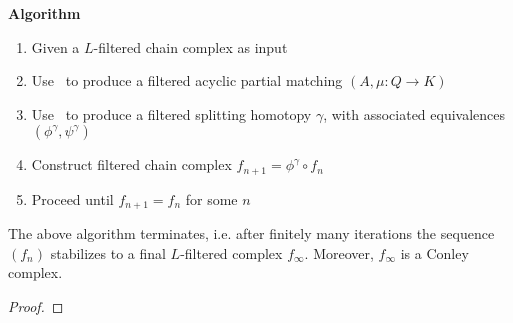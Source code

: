 {\bf Algorithm}
\begin{enumerate}
\item Given a $L$-filtered chain complex as input
\item Use~\cite[Algorithm 3.6]{focm} to produce a filtered acyclic partial matching $(A,\mu:Q\to K)$
\item Use~\cite[Algorithm 3.12]{focm} to produce a filtered splitting homotopy $\gamma$, with associated equivalences $(\phi^\gamma,\psi^\gamma)$
\item Construct filtered chain complex $f_{n+1}=\phi^\gamma \circ f_n$
\item Proceed until $f_{n+1}=f_n$ for some $n$
\end{enumerate}


\begin{thm}
The above algorithm terminates, i.e. after finitely many iterations the sequence $(f_n)$ stabilizes to a final $L$-filtered complex $f_\infty$.  Moreover, $f_\infty$ is a Conley complex.
\end{thm}
\begin{proof}

\end{proof}






 